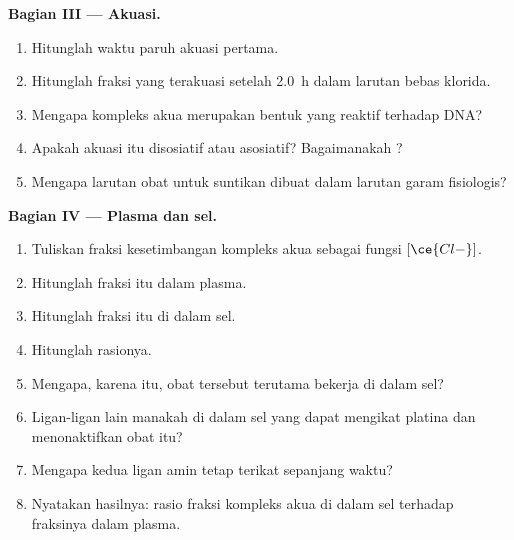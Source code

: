 \begin{problem}
\medskip\noindent\textbf{Bagian III --- Akuasi.}
\begin{enumerate}[resume, beginpenalty=10000]
  \item Hitunglah waktu paruh akuasi pertama.
  \item Hitunglah fraksi yang terakuasi setelah \qty{2.0}{h} dalam larutan bebas klorida.
  \item Mengapa kompleks akua merupakan bentuk yang reaktif terhadap DNA?
  \item Apakah akuasi itu disosiatif atau asosiatif? Bagaimanakah ?
  \item Mengapa larutan obat untuk suntikan dibuat dalam larutan garam fisiologis?
\end{enumerate}

\medskip\noindent\textbf{Bagian IV --- Plasma dan sel.}
\begin{enumerate}[resume, beginpenalty=10000]
  \item Tuliskan fraksi kesetimbangan kompleks akua sebagai fungsi
        $[\ce{Cl-}]$.
  \item Hitunglah fraksi itu dalam plasma.
  \item Hitunglah fraksi itu di dalam sel.
  \item Hitunglah rasionya.
  \item Mengapa, karena itu, obat tersebut terutama bekerja di dalam sel?
  \item Ligan-ligan lain manakah di dalam sel yang dapat mengikat platina dan menonaktifkan
        obat itu?
  \item Mengapa kedua ligan amin tetap terikat sepanjang waktu?
  \item Nyatakan hasilnya: rasio fraksi kompleks akua di dalam sel terhadap
        fraksinya dalam plasma.
\end{enumerate}
\end{problem}
